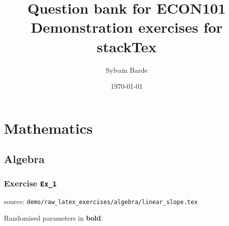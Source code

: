 \documentclass[a4paper, leqno, 12pt]{report}
\title{\bf Question bank for ECON101 Demonstration exercises for stackTex}
\author{Sylvain Barde}
\date{\today}
\begin{document}
\maketitle                              %
\hypertarget{contents}{}                %
\tableofcontents                        %

\singlespacing

\chapter{Mathematics}
\section{Algebra}
\subsection{Exercise \texttt{Ex\_1}}
source: \texttt{demo/raw\_latex\_exercises/algebra/linear\_slope.tex}

Randomised parameters in \textbf{bold}. 
\end{document}
